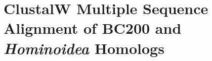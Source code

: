 \documentclass[conference, 11pt]{IEEEtran}
\begin{document}





\section{ClustalW Multiple Sequence Alignment of BC200 and \emph{Hominoidea} Homologs}
\label{app:B}
\end{document}
